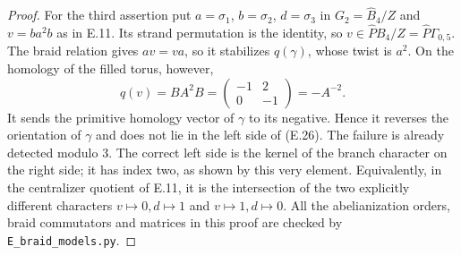 \begin{proof}
For the third assertion put $a=\sigma _1$, $b=\sigma _2$,
$d=\sigma _3$ in $G_2=\widehat B_4/Z$ and
$v=ba^2b$ as in E.11.  Its strand permutation is the identity,
so $v\in\widehat P B_4/Z=\widehat P\Gamma_{0,5}$.
The braid relation gives $av=va$, so it stabilizes
$q(\gamma)$, whose twist is $a^2$.
On the homology of the filled torus, however,
\[
 q(v)=BA^2B=\begin{pmatrix}-1&2\\0&-1\end{pmatrix}
                         =-A^{-2}.
\]
It sends the primitive homology vector of $\gamma$ to its
negative.  Hence it reverses the orientation of $\gamma$ and
does not lie in the left side of (E.26).  The failure is
already detected modulo $3$.  The correct left side is the
kernel of the branch character on the right side; it has
index two, as shown by this very element.  Equivalently,
in the centralizer quotient of E.11, it is the intersection
of the two explicitly different characters
$v\mapsto0,d\mapsto1$ and $v\mapsto1,d\mapsto0$.
All the abelianization orders, braid commutators and matrices
in this proof are checked by \texttt{E\_braid\_models.py}.
\end{proof}

